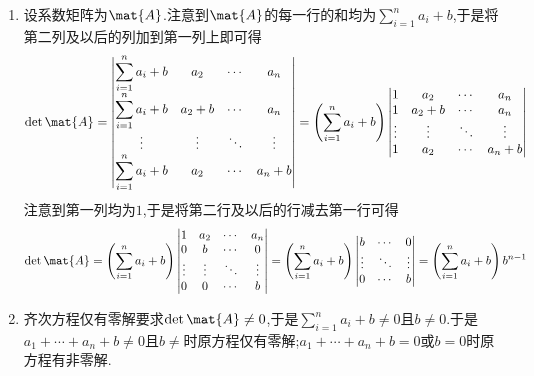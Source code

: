 \documentclass{ctexart}
\begin{document}
\begin{solution}
    \begin{enumerate}[label=\tbf{(\arabic*)},topsep=0pt,parsep=0pt,itemsep=0pt,partopsep=0pt]
        \item 设系数矩阵为$\mat{A}$.注意到$\mat{A}$的每一行的和均为$\displaystyle\sum_{i=1}^{n}a_i+b$,于是将第二列及以后的列加到第一列上即可得
        \[\det\mat{A}=\begin{vmatrix}
            \displaystyle\sum_{i=1}^{n}a_i+b&a_2&\cdots&a_n\\
            \displaystyle\sum_{i=1}^{n}a_i+b&a_2+b&\cdots&a_n\\
            \vdots&\vdots&\ddots&\vdots\\
            \displaystyle\sum_{i=1}^{n}a_i+b&a_2&\cdots&a_n+b\\
        \end{vmatrix}=\left(\sum_{i=1}^{n}a_i+b\right)\begin{vmatrix}
            1&a_2&\cdots&a_n\\
            1&a_2+b&\cdots&a_n\\
            \vdots&\vdots&\ddots&\vdots\\
            1&a_2&\cdots&a_n+b\\
        \end{vmatrix}\]
        注意到第一列均为$1$,于是将第二行及以后的行减去第一行可得
        \[\det\mat{A}=\left(\sum_{i=1}^{n}a_i+b\right)\begin{vmatrix}
            1&a_2&\cdots&a_n\\
            0&b&\cdots&0\\
            \vdots&\vdots&\ddots&\vdots\\
            0&0&\cdots&b\\
        \end{vmatrix}=\left(\sum_{i=1}^{n}a_i+b\right)\begin{vmatrix}
            b&\cdots&0\\
            \vdots&\ddots&\vdots\\
            0&\cdots&b\\
        \end{vmatrix}=\left(\displaystyle\sum_{i=1}^{n}a_i+b\right)b^{n-1}\]
        \item 齐次方程仅有零解要求$\det\mat{A}\neq0$,于是$\displaystyle\sum_{i=1}^{n}a_i+b\neq0$且$b\neq0$.于是$a_1+\cdots+a_n+b\neq0$且$b\neq$时原方程仅有零解;$a_1+\cdots+a_n+b=0$或$b=0$时原方程有非零解.
    \end{enumerate}
\end{solution}
\end{document}
